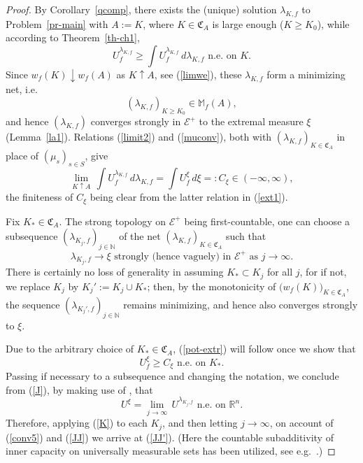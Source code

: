 \documentclass[12pt,a4paper,reqno]{amsart} %
\theoremstyle{lause}
\theoremstyle{maaritelma}
\theoremstyle{lause}
\theoremstyle{maaritelma}
\numberwithin{equation}{section}
\begin{document}
\begin{proof} By Corollary~\ref{qcomp}, there exists the (unique) solution $\lambda_{K,f}$ to Problem~\ref{pr-main} with $A:=K$, where $K\in\mathfrak C_A$ is large enough ($K\geqslant K_0$), while according to Theorem~\ref{th-ch1},
\begin{equation}\label{K}
U_f^{\lambda_{K,f}}\geqslant\int U^{\lambda_{K,f}}_f\,d\lambda_{K,f}\text{ \ n.e.\ on $K$.}
\end{equation}
Since $w_f(K)\downarrow w_f(A)$ as $K\uparrow A$, see (\ref{limwe}), these $\lambda_{K,f}$ form a minimizing net, i.e.
\[(\lambda_{K,f})_{K\geqslant K_0}\in\mathbb M_f(A),\]
and hence $(\lambda_{K,f})$ converges strongly in $\mathcal E^+$ to the extremal measure $\xi$ (Lemma~\ref{la1}). Relations  (\ref{limit2}) and (\ref{muconv}), both with $(\lambda_{K,f})_{K\in\mathfrak C_A}$ in place of $(\mu_s)_{s\in S}$, give
\begin{equation}\label{conv5}
\lim_{K\uparrow A}\,\int U^{\lambda_{K,f}}_f\,d\lambda_{K,f}=\int U^\xi_f\,d\xi=:C_\xi\in(-\infty,\infty),
\end{equation}
the finiteness of $C_\xi$ being clear from the latter relation in (\ref{ext1}).

Fix $K_*\in\mathfrak C_A$. The strong topology on $\mathcal E^+$ being first-countable, one can choose a subsequence $(\lambda_{K_j,f})_{j\in\mathbb N}$ of the net $(\lambda_{K,f})_{K\in\mathfrak C_A}$ such that
\begin{equation}\label{J}
 \lambda_{K_j,f}\to\xi\text{ \ strongly (hence vaguely) in $\mathcal E^+$ as $j\to\infty$.}
\end{equation}
There is certainly no loss of generality in assuming
$K_*\subset K_j$ for all $j$,
for if not, we replace $K_j$ by $K_j':=K_j\cup K_*$; then, by the monotonicity of $\bigl(w_f(K)\bigr)_{K\in\mathfrak C_A}$, the sequence $(\lambda_{K_j',f})_{j\in\mathbb N}$ remains minimizing, and hence also converges strongly to $\xi$.

Due to the arbitrary choice of $K_*\in\mathfrak C_A$, (\ref{pot-extr}) will follow once we show that
\begin{equation}\label{JJ'}U^\xi_f\geqslant C_\xi\text{ \ n.e.\ on $K_*$}.\end{equation}
Passing if necessary to a subsequence and changing the notation, we conclude from (\ref{J}), by making use of \cite[p.~166, Remark]{F1}, that
\begin{equation}\label{JJ}U^\xi=\lim_{j\to\infty}\,U^{\lambda_{K_j,f}}\text{ \ n.e.\ on $\mathbb R^n$}.\end{equation}
Therefore, applying (\ref{K}) to each $K_j$, and then letting $j\to\infty$, on account of (\ref{conv5}) and (\ref{JJ}) we arrive at (\ref{JJ'}). (Here the countable subadditivity of inner capacity on universally measurable sets has been utilized, see e.g.\ \cite[p.~144]{L}.)


\end{proof}
\end{document}
